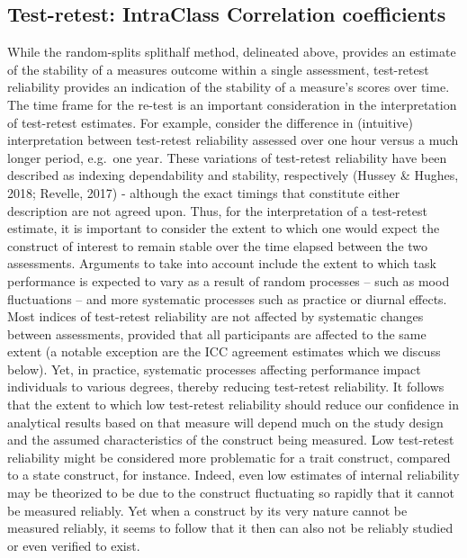 \documentclass[english,,man,floatsintext]{apa6}
\begin{document}
\hypertarget{test-retest-intraclass-correlation-coefficients}{%
\subsection{Test-retest: IntraClass Correlation coefficients}\label{test-retest-intraclass-correlation-coefficients}}

While the random-splits splithalf method, delineated above, provides an estimate of the stability of a measures outcome within a single assessment, test-retest reliability provides an indication of the stability of a measure's scores over time. The time frame for the re-test is an important consideration in the interpretation of test-retest estimates. For example, consider the difference in (intuitive) interpretation between test-retest reliability assessed over one hour versus a much longer period, e.g.~one year. These variations of test-retest reliability have been described as indexing dependability and stability, respectively (Hussey \& Hughes, 2018; Revelle, 2017) - although the exact timings that constitute either description are not agreed upon. Thus, for the interpretation of a test-retest estimate, it is important to consider the extent to which one would expect the construct of interest to remain stable over the time elapsed between the two assessments. Arguments to take into account include the extent to which task performance is expected to vary as a result of random processes -- such as mood fluctuations -- and more systematic processes such as practice or diurnal effects. Most indices of test-retest reliability are not affected by systematic changes between assessments, provided that all participants are affected to the same extent (a notable exception are the ICC agreement estimates which we discuss below). Yet, in practice, systematic processes affecting performance impact individuals to various degrees, thereby reducing test-retest reliability. It follows that the extent to which low test-retest reliability should reduce our confidence in analytical results based on that measure will depend much on the study design and the assumed characteristics of the construct being measured. Low test-retest reliability might be considered more problematic for a trait construct, compared to a state construct, for instance. Indeed, even low estimates of internal reliability may be theorized to be due to the construct fluctuating so rapidly that it cannot be measured reliably. Yet when a construct by its very nature cannot be measured reliably, it seems to follow that it then can also not be reliably studied or even verified to exist.
\end{document}
